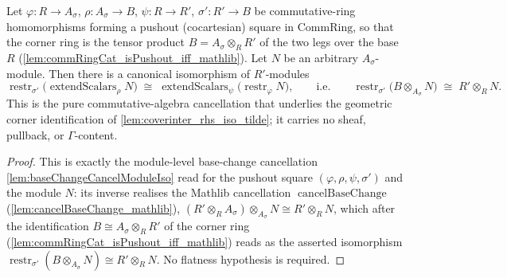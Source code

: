 \begin{lemma}\leanok
  \label{lem:coverinter_baseChanged_module_iso_tensor}
  Let \(\varphi : R \to A_\sigma\), \(\rho : A_\sigma \to B\), \(\psi : R \to R'\),
  \(\sigma' : R' \to B\) be commutative-ring homomorphisms forming a pushout (cocartesian)
  square in \(\mathrm{CommRing}\), so that the corner ring is the tensor product
  \(B = A_\sigma \otimes_R R'\) of the two legs over the base \(R\)
  (\cref{lem:commRingCat_isPushout_iff_mathlib}). Let \(N\) be an arbitrary
  \(A_\sigma\)-module. Then there is a canonical isomorphism of \(R'\)-modules
  \[
    \operatorname{restr}_{\sigma'}\bigl(\operatorname{extendScalars}_\rho N\bigr)
      \;\cong\;
    \operatorname{extendScalars}_\psi\bigl(\operatorname{restr}_\varphi N\bigr),
    \qquad\text{i.e.}\qquad
    \operatorname{restr}_{\sigma'}\bigl(B \otimes_{A_\sigma} N\bigr)
      \;\cong\; R' \otimes_R N.
  \]
  This is the pure commutative-algebra cancellation that underlies the geometric corner
  identification of \cref{lem:coverinter_rhs_iso_tilde}; it carries no sheaf, pullback, or
  \(\Gamma\)-content.
\end{lemma}
\begin{proof}
  This is exactly the module-level base-change cancellation \cref{lem:baseChangeCancelModuleIso}
  read for the pushout square \((\varphi, \rho, \psi, \sigma')\) and the module \(N\): its
  inverse realises the Mathlib cancellation \(\operatorname{cancelBaseChange}\)
  (\cref{lem:cancelBaseChange_mathlib}),
  \((R' \otimes_R A_\sigma) \otimes_{A_\sigma} N \cong R' \otimes_R N\), which after the
  identification \(B \cong A_\sigma \otimes_R R'\) of the corner ring
  (\cref{lem:commRingCat_isPushout_iff_mathlib}) reads as the asserted isomorphism
  \(\operatorname{restr}_{\sigma'}(B \otimes_{A_\sigma} N) \cong R' \otimes_R N\). No flatness
  hypothesis is required.
\end{proof}

